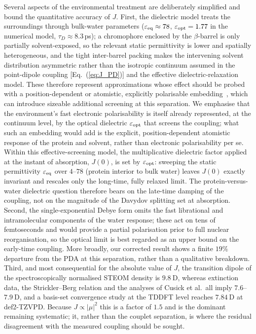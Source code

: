 \documentclass[journal=jpcbfk, manuscript=article, layout=twocolumn, doi=true]{achemso}
\begin{document}
{Several aspects of the environmental treatment are deliberately simplified and bound the quantitative accuracy of $J$. First, the dielectric model treats the surroundings through bulk-water parameters ($\varepsilon_{\rm eq}\approx 78$, $\varepsilon_{\rm opt}=1.77$ in the numerical model, $\tau_D\approx 8.3$\,ps); a chromophore enclosed by the $\beta$-barrel is only partially solvent-exposed, so the relevant static permittivity is lower and spatially heterogeneous, and the tight inter-barrel packing makes the intervening solvent distribution asymmetric rather than the isotropic continuum assumed in the point-dipole coupling [Eq.~(\ref{eq:J_PD})] and the effective dielectric-relaxation model. These therefore represent approximations whose effect should be probed with a position-dependent or atomistic, explicitly polarisable embedding~\cite{ozaydin2023unraveling, mennucci2012}, which can introduce sizeable additional screening at this separation. We emphasise that the environment's fast electronic polarisability is itself already represented, at the continuum level, by the optical dielectric $\varepsilon_{\rm opt}$ that screens the coupling; what such an embedding would add is the explicit, position-dependent atomistic response of the protein and solvent, rather than electronic polarisability per se. Within this effective-screening model, the multiplicative dielectric factor applied at the instant of absorption, $J(0)$, is set by $\varepsilon_{\rm opt}$: sweeping the static permittivity $\varepsilon_{\rm eq}$ over $4$--$78$ (protein interior to bulk water) leaves $J(0)$ exactly invariant and rescales only the long-time, fully relaxed limit. The protein-versus-water dielectric question therefore bears on the late-time damping of the coupling, not on the magnitude of the Davydov splitting set at absorption. Second, the single-exponential Debye form omits the fast librational and intramolecular components of the water response; these act on tens of femtoseconds and would provide a partial polarisation prior to full nuclear reorganisation, so the optical limit is best regarded as an upper bound on the early-time coupling. More broadly, our corrected result shows a finite $19\%$ departure from the PDA at this separation, rather than a qualitative breakdown. Third, and most consequential for the absolute value of $J$, the transition dipole of the spectroscopically normalised STEOM density is $9.8~\mathrm{D}$, whereas extinction data, the Strickler--Berg relation and the analyses of Cusick et al.\ all imply $7.6$--$7.9~\mathrm{D}$, and a basis-set convergence study at the TDDFT level reaches $7.84~\mathrm{D}$ at def2-TZVPD. Because $J\propto|\mu|^{2}$ this is a factor of $1.5$ and is the dominant remaining systematic; it, rather than the couplet separation, is where the residual disagreement with the measured coupling should be sought.}
\end{document}
